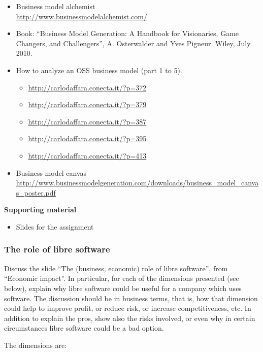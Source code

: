 \documentclass[a4paper]{article}
\begin{document}
\begin{itemize}
\item Business model alchemist \\
  \url{http://www.businessmodelalchemist.com/} 
\item Book: ``Business Model Generation: A Handbook for Visionaries, Game Changers, and Challengers'', A. Osterwalder and Yves Pigneur. Wiley, July 2010.
\item How to analyze an OSS business model (part 1 to 5).
  \begin{itemize}
  \item \url{http://carlodaffara.conecta.it/?p=372}
  \item \url{http://carlodaffara.conecta.it/?p=379}
  \item \url{http://carlodaffara.conecta.it/?p=387}
  \item \url{http://carlodaffara.conecta.it/?p=395}
  \item \url{http://carlodaffara.conecta.it/?p=413}
  \end{itemize}
\item Business model canvas \\
  \url{http://www.businessmodelgeneration.com/downloads/business_model_canvas_poster.pdf}
\end{itemize}

\textbf{Supporting material}

\begin{itemize}
\item Slides for the assignment
\end{itemize}


\subsubsection{The role of libre software}
\label{sub:impact-role}

Discuss the slide ``The (business, economic) role of libre software'', from ``Economic impact''. In particular, for each of the dimensions presented (see below), explain why libre software could be useful for a company which uses software. The discussion should be in business terms, that is, how that dimension could help to improve profit, or reduce risk, or increase competitiveness, etc. In addition to explain the pros, show also the risks involved, or even why in certain circumstances libre software could be a bad option.

The dimensions are:
\end{document}
